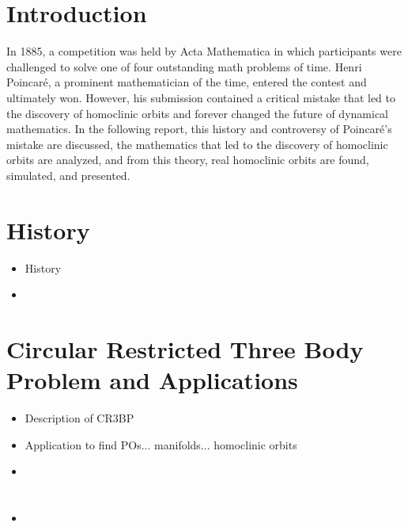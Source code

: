 \documentclass[11pt]{article} %
\title{\color{red}{We need a title, boi}}
\author{Luke Bury \& Don Kuettel}
\begin{document}
\maketitle
\section*{Introduction}
In 1885, a competition was held by Acta Mathematica in which participants were challenged to solve one of four outstanding math problems of time. Henri Poincaré, a prominent mathematician of the time, entered the contest and ultimately won. However, his submission contained a critical mistake that led to the discovery of homoclinic orbits and forever changed the future of dynamical mathematics. In the following report, this history and controversy of Poincaré's mistake are discussed, the mathematics that led to the discovery of homoclinic orbits are analyzed, and from this theory, real homoclinic orbits are found, simulated, and presented. 

\section*{History}
\begin{itemize}
	\item \color{red}History
	\item \color{black}
\end{itemize}

\section*{Circular Restricted Three Body Problem and Applications}
\begin{itemize}
	\item \color{red}Description of CR3BP
	\item Application to find POs... manifolds... homoclinic orbits
	\item \color{black}
\end{itemize}

\section*{\color{red}{Mathtastic Section}}
\begin{itemize}
	\item \color{red}{Looking into it...}\color{black}
\end{itemize}
\end{document}

